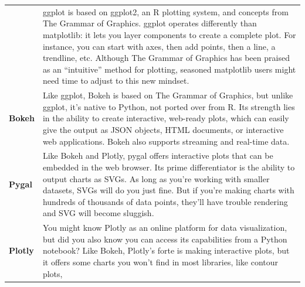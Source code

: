 \documentclass[]{book}
\theoremstyle{definition}
\theoremstyle{definition}
\theoremstyle{definition}
\theoremstyle{remark}
\begin{document}
\begin{longtable}[]{@{}ll@{}}
\begin{minipage}[t]{0.10\columnwidth}
\end{minipage} & \begin{minipage}[t]{0.16\columnwidth}\raggedright\strut
ggplot is based on ggplot2, an R plotting system, and concepts from The
Grammar of Graphics. ggplot operates differently than matplotlib: it
lets you layer components to create a complete plot. For instance, you
can start with axes, then add points, then a line, a trendline, etc.
Although The Grammar of Graphics has been praised as an ``intuitive''
method for plotting, seasoned matplotlib users might need time to adjust
to this new mindset.\strut
\end{minipage}\tabularnewline
\begin{minipage}[t]{0.10\columnwidth}\raggedright\strut
\textbf{Bokeh}\strut
\end{minipage} & \begin{minipage}[t]{0.16\columnwidth}\raggedright\strut
Like ggplot, Bokeh is based on The Grammar of Graphics, but unlike
ggplot, it's native to Python, not ported over from R. Its strength lies
in the ability to create interactive, web-ready plots, which can easily
give the output as JSON objects, HTML documents, or interactive web
applications. Bokeh also supports streaming and real-time data.\strut
\end{minipage}\tabularnewline
\begin{minipage}[t]{0.10\columnwidth}\raggedright\strut
\textbf{Pygal}\strut
\end{minipage} & \begin{minipage}[t]{0.16\columnwidth}\raggedright\strut
Like Bokeh and Plotly, pygal offers interactive plots that can be
embedded in the web browser. Its prime differentiator is the ability to
output charts as SVGs. As long as you're working with smaller datasets,
SVGs will do you just fine. But if you're making charts with hundreds of
thousands of data points, they'll have trouble rendering and SVG will
become sluggish.\strut
\end{minipage}\tabularnewline
\begin{minipage}[t]{0.10\columnwidth}\raggedright\strut
\textbf{Plotly}\strut
\end{minipage} & \begin{minipage}[t]{0.16\columnwidth}\raggedright\strut
You might know Plotly as an online platform for data visualization, but
did you also know you can access its capabilities from a Python
notebook? Like Bokeh, Plotly's forte is making interactive plots, but it
offers some charts you won't find in most libraries, like contour plots,

\end{minipage}
\end{longtable}
\end{document}
